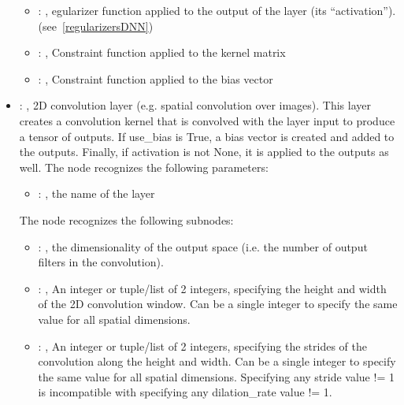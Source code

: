 \begin{itemize}
\begin{itemize}
        \item {}: , 
          egularizer function applied to the output         of the layer (its ``activation'').
          (see~\ref{regularizersDNN})

        \item {}: , 
          Constraint function applied to the kernel matrix

        \item {}: , 
          Constraint function applied to the bias vector
      \end{itemize}

    \item {}: , 
      2D convolution layer (e.g. spatial convolution over images). This layer creates a convolution
      kernel         that is convolved with the layer input to produce a tensor of outputs. If
      use\_bias is True, a bias vector         is created and added to the outputs. Finally, if
      activation is not None, it is applied to the outputs         as well.
      The  node recognizes the following parameters:
        \begin{itemize}
          \item {}: , 
            the name of the layer
      \end{itemize}

      The  node recognizes the following subnodes:
      \begin{itemize}
        \item {}: , 
          the dimensionality of the output space (i.e. the number of output filters in the
          convolution).

        \item {}: , 
          An integer or tuple/list of 2 integers, specifying the height and width of the 2D
          convolution window.         Can be a single integer to specify the same value for all
          spatial dimensions.

        \item {}: , 
          An integer or tuple/list of 2 integers, specifying the strides of the convolution along
          the height         and width. Can be a single integer to specify the same value for all
          spatial dimensions. Specifying any         stride value != 1 is incompatible with
          specifying any dilation\_rate value != 1.


\end{itemize}
\end{itemize}
